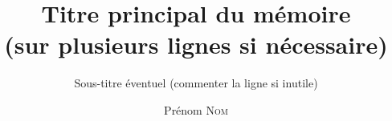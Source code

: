 \documentclass{univ-thesis}
\title{Titre principal du mémoire \\ (sur plusieurs lignes si nécessaire)}
\subtitle{Sous-titre éventuel (commenter la ligne si inutile)}
\author{Prénom \textsc{Nom}}
\begin{document}


\maketitle

% 
% 

\tableofcontents

\newpage

% 
% 
% 
% 
% 

% 
% 

\backcoverpage
\end{document}
